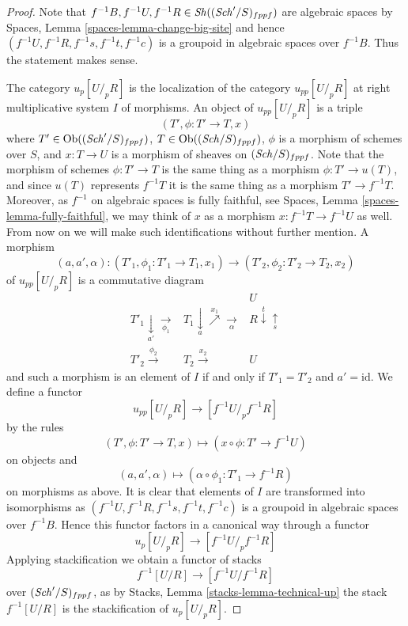 \begin{proof}
Note that $f^{-1}B, f^{-1}U, f^{-1}R \in \mathit{Sh}((\mathit{Sch}'/S)_{fppf})$
are algebraic spaces by
Spaces, Lemma \ref{spaces-lemma-change-big-site}
and hence $(f^{-1}U, f^{-1}R, f^{-1}s, f^{-1}t, f^{-1}c)$
is a groupoid in algebraic spaces over $f^{-1}B$. Thus the statement makes
sense.

\medskip\noindent
The category $u_p[U/_{\!p}R]$ is the localization of the category
$u_{pp}[U/_{\!p}R]$ at right multiplicative system $I$ of morphisms.
An object of $u_{pp}[U/_{\!p}R]$ is a triple
$$
(T', \phi : T' \to T, x)
$$
where
$T' \in \operatorname{Ob}((\mathit{Sch}'/S)_{fppf})$,
$T \in \operatorname{Ob}((\mathit{Sch}/S)_{fppf})$, $\phi$ is a morphism of schemes
over $S$, and $x : T \to U$ is a morphism of sheaves on
$(\mathit{Sch}/S)_{fppf}$. Note that the morphism of
schemes $\phi : T' \to T$ is the same thing as a morphism
$\phi : T' \to u(T)$, and since $u(T)$ represents $f^{-1}T$ it is the
same thing as a morphism $T' \to f^{-1}T$. Moreover, as $f^{-1}$ on
algebraic spaces is fully faithful, see
Spaces, Lemma \ref{spaces-lemma-fully-faithful},
we may think of $x$ as a morphism $x : f^{-1}T \to f^{-1}U$ as well.
From now on we will make such identifications without further mention.
A morphism
$$
(a, a', \alpha) :
(T'_1, \phi_1 : T'_1 \to T_1, x_1)
\longrightarrow
(T'_2, \phi_2 : T'_2 \to T_2, x_2)
$$
of $u_{pp}[U/_{\!p}R]$ is a commutative diagram
$$
\begin{array}{ccc} &  & U \\ T'_1 \underset{a'}{\downarrow}\underset{\phi_1}{\longrightarrow} & T_1 \underset{a}{\downarrow}\overset{x_1}{\nearrow}\underset{\alpha}{\longrightarrow} & R \overset{t}{\downarrow}\underset{s}{\uparrow} \\ T'_2 \overset{\phi_2}{\longrightarrow} & T_2 \overset{x_2}{\longrightarrow} & U\end{array}
$$
and such a morphism is an element of $I$ if and only if
$T'_1 = T'_2$ and $a' = \text{id}$.
We define a functor
$$
u_{pp}[U/_{\!p}R] \longrightarrow [f^{-1}U/_{\!p}f^{-1}R]
$$
by the rules
$$
(T', \phi : T' \to T, x) \longmapsto (x \circ \phi : T' \to f^{-1}U)
$$
on objects and
$$
(a, a', \alpha) \longmapsto (\alpha \circ \phi_1 : T'_1 \to f^{-1}R)
$$
on morphisms as above. It is clear that elements of $I$ are transformed
into isomorphisms as $(f^{-1}U, f^{-1}R, f^{-1}s, f^{-1}t, f^{-1}c)$
is a groupoid in algebraic spaces over $f^{-1}B$. Hence this functor
factors in a canonical way through a functor
$$
u_p[U/_{\!p}R] \longrightarrow [f^{-1}U/_{\!p}f^{-1}R]
$$
Applying stackification we obtain a functor of stacks
$$
f^{-1}[U/R] \longrightarrow [f^{-1}U/f^{-1}R]
$$
over $(\mathit{Sch}'/S)_{fppf}$, as by
Stacks, Lemma \ref{stacks-lemma-technical-up}
the stack $f^{-1}[U/R]$ is the stackification of $u_p[U/_{\!p}R]$.


\end{proof}
